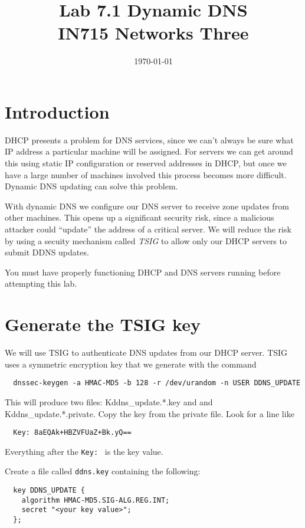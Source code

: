\documentclass{article}
\begin{document}
\title{ Lab 7.1 Dynamic DNS\\ IN715 Networks Three}
\date{\today}
\maketitle

\section*{Introduction}
DHCP presents a problem for DNS services, since we can't always be sure what IP address a particular
machine will be assigned.  For servers we can get around this using static IP configuration or 
reserved addresses in DHCP, but once we have a large number of machines involved this process becomes more difficult.  Dynamic DNS updating can solve this problem.

With dynamic DNS we configure our DNS server to receive zone updates from other machines.  This opens up 
a significant security risk, since a malicious attacker could ``update'' the address of a critical 
server.  We will reduce the risk by using a secuity mechanism called \emph{TSIG} to allow only
our DHCP servers to submit DDNS updates.  

You must have properly functioning DHCP and DNS servers running before attempting this lab.

\section{Generate the TSIG key}
We will use TSIG to authenticate DNS updates from our DHCP server.  TSIG uses a symmetric encryption key that we generate with the command

\begin{verbatim}
  dnssec-keygen -a HMAC-MD5 -b 128 -r /dev/urandom -n USER DDNS_UPDATE
\end{verbatim}

This will produce two files: Kddns\_update.*.key and and Kddns\_update.*.private.  Copy the key from the
private file.  Look for a line like 

\begin{verbatim}
  Key: 8aEQAk+HBZVFUaZ+Bk.yQ==
\end{verbatim}

Everything after the \texttt{Key: } is the key value.

Create a file called \texttt{ddns.key} containing the following:

\begin{verbatim}
  key DDNS_UPDATE {
    algorithm HMAC-MD5.SIG-ALG.REG.INT;
    secret "<your key value>";
  };
\end{verbatim}
\end{document}
